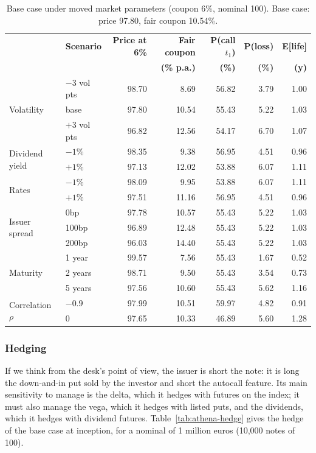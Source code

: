 \documentclass[11pt,a4paper]{article}
\begin{document}
\begin{table}[htbp]
\centering
\small
\begin{tabular}{@{}llrrrrr@{}}
\toprule
 & \textbf{Scenario} & \textbf{Price at 6\%} & \textbf{Fair coupon} & \textbf{P(call $t_1$)} & \textbf{P(loss)} & \textbf{E[life]} \\
 & & & \textbf{(\% p.a.)} & \textbf{(\%)} & \textbf{(\%)} & \textbf{(y)} \\
\midrule
\multirow{3}{*}{Volatility} & $-3$ vol pts & 98.70 & 8.69 & 56.82 & 3.79 & 1.00 \\
 & base & 97.80 & 10.54 & 55.43 & 5.22 & 1.03 \\
 & $+3$ vol pts & 96.82 & 12.56 & 54.17 & 6.70 & 1.07 \\
\midrule
\multirow{2}{*}{Dividend yield} & $-1\%$ & 98.35 & 9.38 & 56.95 & 4.51 & 0.96 \\
 & $+1\%$ & 97.13 & 12.02 & 53.88 & 6.07 & 1.11 \\
\midrule
\multirow{2}{*}{Rates} & $-1\%$ & 98.09 & 9.95 & 53.88 & 6.07 & 1.11 \\
 & $+1\%$ & 97.51 & 11.16 & 56.95 & 4.51 & 0.96 \\
\midrule
\multirow{3}{*}{Issuer spread} & 0bp & 97.78 & 10.57 & 55.43 & 5.22 & 1.03 \\
 & 100bp & 96.89 & 12.48 & 55.43 & 5.22 & 1.03 \\
 & 200bp & 96.03 & 14.40 & 55.43 & 5.22 & 1.03 \\
\midrule
\multirow{3}{*}{Maturity} & 1 year & 99.57 & 7.56 & 55.43 & 1.67 & 0.52 \\
 & 2 years & 98.71 & 9.50 & 55.43 & 3.54 & 0.73 \\
 & 5 years & 97.56 & 10.60 & 55.43 & 5.62 & 1.16 \\
\midrule
\multirow{2}{*}{Correlation $\rho$} & $-0.9$ & 97.99 & 10.51 & 59.97 & 4.82 & 0.91 \\
 & $0$ & 97.65 & 10.33 & 46.89 & 5.60 & 1.28 \\
\bottomrule
\end{tabular}
\caption{Base case under moved market parameters (coupon 6\%, nominal 100). Base case: price 97.80, fair coupon
10.54\%.}
\label{tab:athena-market}
\end{table}

\clearpage
\subsubsection{Hedging}

If we think from the desk's point of view, the issuer is short the note: it is long the down-and-in put sold by the
investor and short the autocall feature. Its main sensitivity to manage is the delta, which it hedges with futures on
the index; it must also manage the vega, which it hedges with listed puts, and the dividends, which it hedges with
dividend futures. Table~\ref{tab:athena-hedge} gives the hedge of the base case at inception, for a nominal of
1 million euros (10{,}000 notes of 100).
\end{document}
